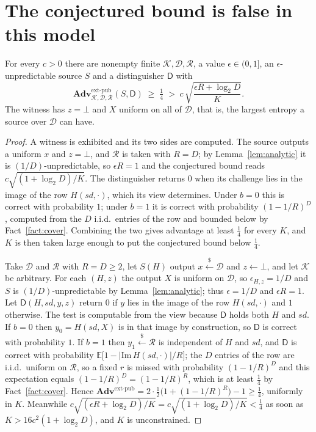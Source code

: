 \documentclass{conjura-solution}
\newcommand{\Adv}{\mathbf{Adv}}
\newcommand{\extp}{\mathrm{ext}\text{-}\mathrm{pub}}
\newcommand{\sd}{\mathit{sd}}
\renewcommand{\sample}{\stackrel{{\scriptscriptstyle\$}}{\leftarrow}}
\newcommand{\calK}{\mathcal{K}}
\newcommand{\calD}{\mathcal{D}}
\newcommand{\calR}{\mathcal{R}}
\theoremstyle{cjplain}
\begin{document}
\section{The conjectured bound is false in this model}\label{sec:false}

\begin{proposition}\label{prop:false}
For every $c > 0$ there are nonempty finite $\calK, \calD, \calR$, a value $\epsilon \in (0,1]$, an
$\epsilon$-unpredictable source $S$ and a distinguisher $\mathsf{D}$ with
\[
  \Adv^{\extp}_{\calK,\calD,\calR}(S,\mathsf{D}) \;\ge\; \tfrac14
  \;>\; c\,\sqrt{\frac{\epsilon R + \log_2 D}{K}} .
\]
The witness has $z = \bot$ and $X$ uniform on all of $\calD$, that is, the largest entropy a
source over $\calD$ can have.
\end{proposition}

\begin{proof}
A witness is exhibited and its two sides are computed. The source outputs a uniform $x$ and
$z = \bot$, and $\calR$ is taken with $R = D$; by Lemma~\ref{lem:analytic} it is
$(1/D)$-unpredictable, so $\epsilon R = 1$ and the conjectured bound reads
$c\sqrt{(1+\log_2 D)/K}$. The distinguisher returns $0$ when its challenge lies in the image of the
row $H(\sd,\cdot)$, which its view determines. Under $b = 0$ this is correct with probability $1$;
under $b = 1$ it is correct with probability $(1-1/R)^{D}$, computed from the $D$ i.i.d.\ entries
of the row and bounded below by Fact~\ref{fact:cover}. Combining the two gives advantage at least $\tfrac14$ for every $K$, and $K$ is then
taken large enough to put the conjectured bound below $\tfrac14$.

Take $\calD$ and $\calR$ with $R = D \ge 2$, let $S(H)$ output $x \sample \calD$ and
$z \leftarrow \bot$, and let $\calK$ be arbitrary. For each $(H,z)$ the output $X$ is uniform on
$\calD$, so $\epsilon_{H,z} = 1/D$ and $S$ is $(1/D)$-unpredictable by
Lemma~\ref{lem:analytic}; thus $\epsilon = 1/D$ and $\epsilon R = 1$. Let $\mathsf{D}(H,\sd,y,z)$
return $0$ if $y$ lies in the image of the row $H(\sd,\cdot)$ and $1$ otherwise. The test is
computable from the view because $\mathsf{D}$ holds both $H$ and $\sd$. If $b = 0$ then
$y_0 = H(\sd,X)$ is in that image by construction, so $\mathsf{D}$ is correct with probability $1$.
If $b = 1$ then $y_1 \sample \calR$ is independent of $H$ and $\sd$, and $\mathsf{D}$ is correct
with probability $\mathbb{E}\bigl[1 - |\mathrm{Im}\,H(\sd,\cdot)|/R\bigr]$; the $D$ entries of the
row are i.i.d.\ uniform on $\calR$, so a fixed $r$ is missed with probability $(1-1/R)^{D}$ and this
expectation equals $(1-1/R)^{D} = (1-1/R)^{R}$, which is at least $\tfrac14$ by
Fact~\ref{fact:cover}. Hence
$\Adv^{\extp} = 2 \cdot \tfrac12\bigl(1 + (1-1/R)^{R}\bigr) - 1 \ge \tfrac14$, uniformly in $K$.
Meanwhile $c\sqrt{(\epsilon R + \log_2 D)/K} = c\sqrt{(1+\log_2 D)/K} < \tfrac14$ as soon as
$K > 16c^{2}(1 + \log_2 D)$, and $K$ is unconstrained.
\end{proof}
\end{document}
